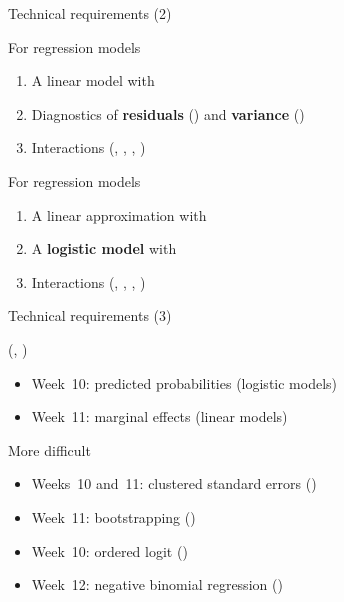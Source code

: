 \documentclass[t]{beamer}
\begin{document}
	\begin{frame}[t]{Technical requirements (2)}

		\begin{block}{For  regression models}

			\begin{enumerate}
				\item A linear model with 
				\item Diagnostics of \textbf{residuals} () and \textbf{variance} ()%
				\item Interactions (, \code{\#}, \code{\#\#}, )
			\end{enumerate}
			
		\end{block}

		\begin{block}{For  regression models}

			\begin{enumerate}
				\item A linear approximation with 
				\item A \textbf{logistic model} with 
				\item Interactions (, \code{\#}, \code{\#\#}, )
			\end{enumerate}

		\end{block}
		    
	\end{frame}

	\begin{frame}[t]{Technical requirements (3)}
    
		\begin{block}{ (, )}

			\begin{itemize}
        \item Week~10: predicted probabilities (logistic models)
        \item Week~11: marginal effects (linear models)
			\end{itemize}
			
		\end{block}

		\begin{block}{More difficult }

			\begin{itemize}
        \item Weeks~10 and~11: clustered standard errors ()
        \item Week~11: bootstrapping ()
        \item Week~10: ordered logit ()
        \item Week~12: negative binomial regression ()
			\end{itemize}
			
		\end{block}
    
	\end{frame}
  
\end{document}
